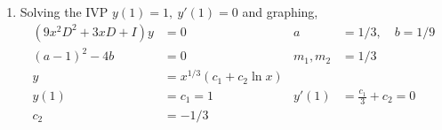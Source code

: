 \begin{enumerate}
    \item Solving the IVP $ y(1) = 1,\ y'(1) = 0 $ and graphing,
          \begin{align}
              (9x^{2}D^{2} + 3xD + I)y & = 0                            & a            & = 1/3, \quad b= 1/9           \\
              (a-1)^{2}-4b             & = 0                            & m_{1}, m_{2} & =  1/3                        \\
              y                        & = x^{1/3}(c_{1} + c_{2} \ln x)                                                \\
              y(1)                     & = c_{1} = 1                    & y'(1)        & = \frac{c_{1}}{3} + c_{2} = 0 \\
              c_{2}                    & = -1/3
          \end{align}
          \begin{figure}[H]
              \centering
          \end{figure}


\end{enumerate}
